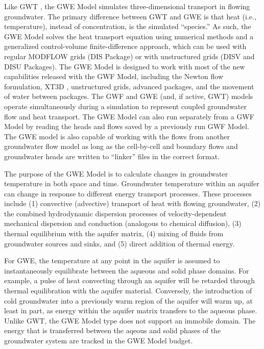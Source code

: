 Like GWT \citep{modflow6gwt}, the GWE Model simulates three-dimensional transport in flowing groundwater.  The primary difference between GWT and GWE is that heat (i.e., temperature), instead of concentration, is the simulated ``species.'' As such, the GWE Model solves the heat transport equation using numerical methods and a generalized control-volume finite-difference approach, which can be used with regular MODFLOW grids (DIS Package) or with unstructured grids (DISV and DISU Packages).  The GWE Model is designed to work with most of the new capabilities released with the GWF Model, including the Newton flow formulation, XT3D \citep{modflow6xt3d}, unstructured grids, advanced packages, and the movement of water between packages.  The GWF and GWE (and, if active, GWT) models operate simultaneously during a \mf simulation to represent coupled groundwater flow and heat transport.  The GWE Model can also run separately from a GWF Model by reading the heads and flows saved by a previously run GWF Model.  The GWE model is also capable of working with the flows from another groundwater flow model as long as the cell-by-cell and boundary flows and groundwater heads are written to ``linker'' files in the correct format.  

The purpose of the GWE Model is to calculate changes in groundwater temperature in both space and time.  Groundwater temperature within an aquifer can change in response to different energy transport processes.  These processes include (1) convective (advective) transport of heat with flowing groundwater, (2) the combined hydrodynamic dispersion processes of velocity-dependent mechanical dispersion and conduction (analogous to chemical diffusion), (3) thermal equilibrium with the aquifer matrix, (4) mixing of fluids from groundwater sources and sinks, and (5) direct addition of thermal energy.

For GWE, the temperature at any point in the aquifer is assumed to instantaneously equilibrate between the aqueous and solid phase domains.  For example, a pulse of heat convecting through an aquifer will be retarded through thermal equilibration with the aquifer material.  Conversely, the introduction of cold groundwater into a previously warm region of the aquifer will warm up, at least in part, as energy within the aquifer matrix transfers to the aqueous phase.  Unlike GWT, the GWE Model type does not support an immobile domain.  The energy that is transferred between the aqeous and solid phases of the groundwater system are tracked in the GWE Model budget.


